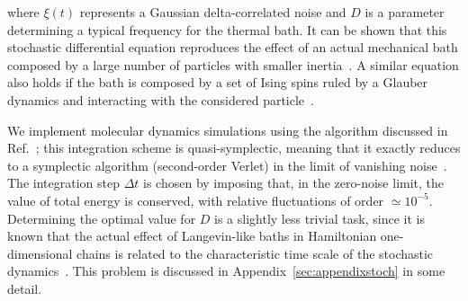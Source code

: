 \documentclass[iop, twocolumns, amssymb,notitlepage]{revtex4-1}
\begin{document}
where $\xi(t)$ represents a Gaussian delta-correlated noise and $D$ is a 
parameter determining a typical frequency for the thermal bath. It can be shown 
that this stochastic differential equation reproduces the effect of an actual 
mechanical bath composed by a large number of particles with smaller 
inertia~\cite{baldovin18}. A similar equation also holds if the bath is composed 
by a set of Ising spins ruled by a Glauber dynamics and interacting with the 
considered particle~\cite{baldovin19}.


We 
implement molecular dynamics simulations using the algorithm discussed in 
Ref.~\cite{miceli19}; this integration scheme is quasi-symplectic, meaning that 
it exactly reduces to a symplectic algorithm (second-order Verlet) in the limit of vanishing 
noise~\cite{melchionna07}. The integration step $\Delta t$ is chosen by imposing 
that, in the zero-noise limit, the value of total energy is conserved, with 
relative fluctuations of order $\simeq 10^{-5}$. Determining the optimal value 
for $D$ is a slightly less trivial task, since it is known that the actual 
effect of Langevin-like baths in Hamiltonian one-dimensional chains is related 
to the characteristic time scale of the stochastic dynamics~\cite{lepri03}. 
This problem is discussed in Appendix~\ref{sec:appendixstoch} in some detail.
 
\end{document}
